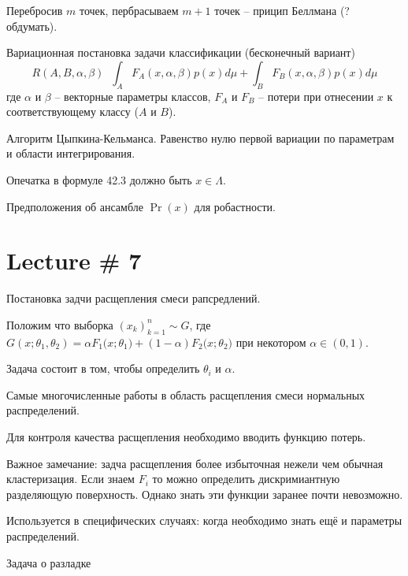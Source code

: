 \documentclass[a4paper]{article}
\newcommand{\brac}[1]{{\left ( #1 \right )}}
\newcommand{\defn}{\mathop{\overset{\Delta}{=}}\nolimits}
\begin{document}
Перебросив $m$ точек, пербрасываем $m+1$ точек -- прицип Беллмана (? обдумать).


Вариационная постановка задачи классификации (бесконечный вариант)
\[R(A,B,\alpha,\beta)\defn \int_A F_A(x,\alpha,\beta) p(x) d\mu + \int_B F_B(x,\alpha,\beta) p(x) d\mu\]
где $\alpha$ и $\beta$ -- векторные параметры классов, $F_A$ и $F_B$ -- потери при отнесении $x$ к соответствующему классу ($A$ и $B$).

Алгоритм Цыпкина-Кельманса.
Равенство нулю первой вариации по параметрам и области интегрирования.

Опечатка в формуле 42.3 должно быть $x\in \Lambda$.

Предположения об ансамбле $\Pr(x)$ для робастности.






\section{Lecture \# 7} %
\label{sec:lecture_7}

Постановка задчи расщепления смеси рапсредлений.

Положим что выборка $\brac{x_k}_{k=1}^n\sim G$, где $G(x;\theta_1,\theta_2) = \alpha F_1\big(x;\theta_1\big) + (1-\alpha)F_2\big(x;\theta_2\big)$ при некотором $\alpha\in \brac{0,1}$.

Задача состоит в том, чтобы определить $\theta_i$ и $\alpha$.

Самые многочисленные работы в область расщепления смеси нормальных распределений.

Для контроля качества расщепления необходимо вводить функцию потерь.

Важное замечание: задча расщепления более избыточная нежели чем обычная кластеризация. Если знаем $F_i$ то можно определить дискримиантную разделяющую поверхность. Однако знать эти функции заранее почти невозможно.

Используется в специфических случаях: когда необходимо знать ещё и параметры распределений.

Задача о разладке








\end{document}
